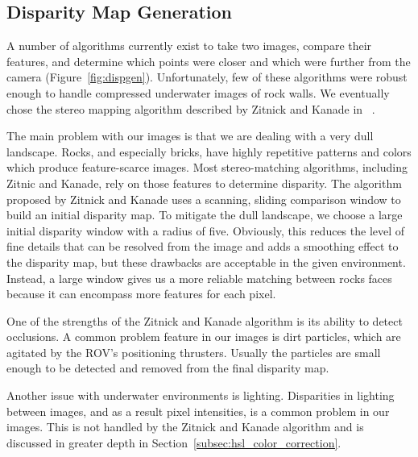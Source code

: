\documentclass[a4paper,twoside]{article}
\begin{document}

\subsection{Disparity Map Generation}

\begin{figure*}[!ht]
   \vspace{-0.2cm}
   \caption{How we generate disparity maps from images.}
  \label{fig:dispgen}
 \end{figure*}


A number of algorithms currently exist to take two images, compare their features, and determine which points were closer and which were further from the camera (Figure~\ref{fig:dispgen}). 
Unfortunately, few of these algorithms were robust enough to handle compressed underwater images of rock walls.
We eventually chose the stereo mapping algorithm described by Zitnick and Kanade in ~\cite{stereo:zitKan}.

The main problem with our images is that we are dealing with a very dull landscape.  
Rocks, and especially bricks, have highly repetitive patterns and colors which produce feature-scarce images.
Most stereo-matching algorithms, including Zitnic and Kanade, rely on those features to determine disparity.  
The algorithm proposed by Zitnick and Kanade uses a scanning, sliding comparison window to build an initial disparity map.  
To mitigate the dull landscape, we choose a large initial disparity window with a radius of five. 
Obviously, this reduces the level of fine details that can be resolved from the image and adds a smoothing effect to the disparity map, but these drawbacks are acceptable in the given environment.  
Instead, a large window gives us a more reliable matching between rocks faces because it can encompass more features for each pixel.  

One of the strengths of the Zitnick and Kanade algorithm is its ability to detect occlusions.  
A common problem feature in our images is dirt particles, which are agitated by the ROV's positioning thrusters.
Usually the particles are small enough to be detected and removed from the final disparity map.

Another issue with underwater environments is lighting.
  Disparities in lighting between images, and as a result pixel intensities, is a common problem in our images.  
This is not handled by the Zitnick and Kanade algorithm and is discussed in greater depth in Section~\ref{subsec:hsl_color_correction}.
\end{document}
